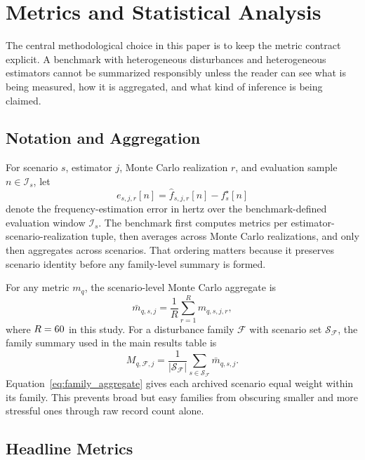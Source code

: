 \section{Metrics and Statistical Analysis}
\label{sec:metrics_and_hypotheses}

The central methodological choice in this paper is to keep the metric contract explicit. A benchmark with heterogeneous disturbances and heterogeneous estimators cannot be summarized responsibly unless the reader can see what is being measured, how it is aggregated, and what kind of inference is being claimed.

\subsection{Notation and Aggregation}

For scenario $s$, estimator $j$, Monte Carlo realization $r$, and evaluation sample $n \in \mathcal{I}_s$, let
\begin{equation}
e_{s,j,r}[n] = \hat{f}_{s,j,r}[n] - f^{\star}_{s}[n]
\label{eq:error_signal}
\end{equation}
denote the frequency-estimation error in hertz over the benchmark-defined evaluation window $\mathcal{I}_s$. The benchmark first computes metrics per estimator-scenario-realization tuple, then averages across Monte Carlo realizations, and only then aggregates across scenarios. That ordering matters because it preserves scenario identity before any family-level summary is formed.

For any metric $m_q$, the scenario-level Monte Carlo aggregate is
\begin{equation}
\bar{m}_{q,s,j} = \frac{1}{R} \sum_{r=1}^{R} m_{q,s,j,r},
\label{eq:mc_aggregate}
\end{equation}
where $R=60{}$ in this study. For a disturbance family $\mathcal{F}$ with scenario set $\mathcal{S}_{\mathcal{F}}$, the family summary used in the main results table is
\begin{equation}
M_{q,\mathcal{F},j} = \frac{1}{|\mathcal{S}_{\mathcal{F}}|} \sum_{s \in \mathcal{S}_{\mathcal{F}}} \bar{m}_{q,s,j}.
\label{eq:family_aggregate}
\end{equation}
Equation~\eqref{eq:family_aggregate} gives each archived scenario equal weight within its family. This prevents broad but easy families from obscuring smaller and more stressful ones through raw record count alone.

\subsection{Headline Metrics}

